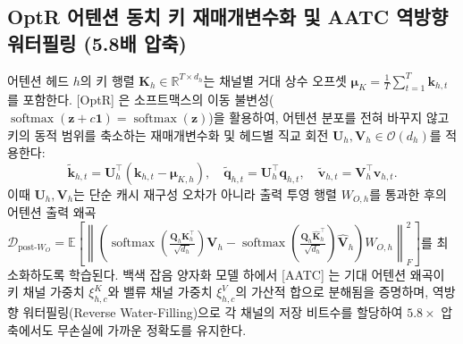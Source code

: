 \documentclass[10pt,a4paper]{article}
\begin{document}
\subsection{\textsf{OptR} 어텐션 동치 키 재매개변수화 및 \textsf{AATC} 역방향 워터필링 (5.8배 압축)}
어텐션 헤드 $h$의 키 행렬 $\mathbf{K}_h \in \mathbb{R}^{T \times d_h}$는 채널별 거대 상수 오프셋 $\boldsymbol{\mu}_K = \frac{1}{T}\sum_{t=1}^T \mathbf{k}_{h,t}$를 포함한다. [OptR] \cite{yun2026optr}은 소프트맥스의 이동 불변성($\operatorname{softmax}(\mathbf{z} + c\mathbf{1}) = \operatorname{softmax}(\mathbf{z})$)을 활용하여, 어텐션 분포를 전혀 바꾸지 않고 키의 동적 범위를 축소하는 재매개변수화 및 헤드별 직교 회전 $\mathbf{U}_h, \mathbf{V}_h \in \mathcal{O}(d_h)$를 적용한다:
\begin{equation}
\widetilde{\mathbf{k}}_{h,t} = \mathbf{U}_h^\top \left( \mathbf{k}_{h,t} - \boldsymbol{\mu}_{K,h} \right), \quad \widetilde{\mathbf{q}}_{h,t} = \mathbf{U}_h^\top \mathbf{q}_{h,t}, \quad \widetilde{\mathbf{v}}_{h,t} = \mathbf{V}_h^\top \mathbf{v}_{h,t}.
\label{eq:optr_reparam}
\end{equation}
이때 $\mathbf{U}_h, \mathbf{V}_h$는 단순 캐시 재구성 오차가 아니라 출력 투영 행렬 $W_{O,h}$를 통과한 후의 어텐션 출력 왜곡 $\mathcal{D}_{\text{post-}W_O} = \mathbb{E}\left[\left\| \left(\operatorname{softmax}(\frac{\mathbf{Q}_h \mathbf{K}_h^\top}{\sqrt{d_h}})\mathbf{V}_h - \operatorname{softmax}(\frac{\mathbf{Q}_h \widehat{\mathbf{K}}_h^\top}{\sqrt{d_h}})\widehat{\mathbf{V}}_h\right) W_{O,h} \right\|_F^2\right]$를 최소화하도록 학습된다. 백색 잡음 양자화 모델 하에서 [AATC] \cite{laus2026aatc}는 기대 어텐션 왜곡이 키 채널 가중치 $\xi_{h,c}^K$와 밸류 채널 가중치 $\xi_{h,c}^V$의 가산적 합으로 분해됨을 증명하며, 역방향 워터필링(Reverse Water-Filling)으로 각 채널의 저장 비트수를 할당하여 $5.8\times$ 압축에서도 무손실에 가까운 정확도를 유지한다.
\end{document}
